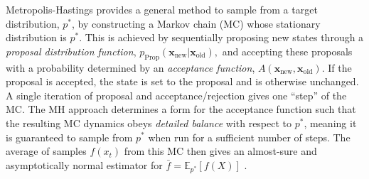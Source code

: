 \documentclass{article}
\newcommand{\realtraj}{\mathbf{x}}
\newcommand{\EV}{\mathbb{E}}
\newcommand{\pdf}{p}
\begin{document}


Metropolis-Hastings provides a general method to sample from a target distribution, $\pdf^*$, by constructing a
Markov chain (MC) whose stationary distribution is $\pdf^*$. This is achieved by sequentially proposing new states through a \textit{proposal distribution function}, $\pdf_{\text{Prop}}(\realtraj_{\text{new}} | \realtraj_{\text{old}}),$ and accepting these proposals with a probability determined by an \textit{acceptance function}, $A(\realtraj_\text{new}, \realtraj_\text{old})$.
If the proposal is accepted, the state is set to the proposal and is otherwise unchanged. A single iteration of proposal and acceptance/rejection gives one ``step'' of the MC. The MH approach determines a form for the acceptance function such that the resulting MC dynamics obeys \textit{detailed balance} with respect to $\pdf^*$, meaning it is guaranteed to sample from $\pdf^*$ when run for a sufficient number of steps. The average of samples $f(x_t)$ from this MC then gives an almost-sure and
asymptotically normal estimator for $\bar{f} = \EV_{\pdf^*}[f(X)]$ \cite{brooks2011handbook}.
\end{document}
